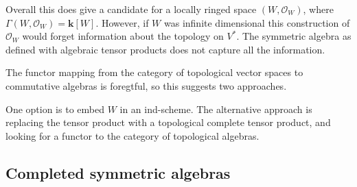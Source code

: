     
    Overall this does give a candidate for a locally ringed space 
    \( (W, \mathcal{O}_W)\), where \( \Gamma(W, \mathcal{O}_W ) = \mathbf{k}[W]\). However, if \(W\) was infinite dimensional this construction of \( \mathcal{O}_W\) would forget information about the topology on \(V^*\). The symmetric algebra as defined with algebraic tensor products does not capture all the information. 
    
    The functor mapping from the category of topological vector spaces to commutative algebras is foregtful, so this suggests two approaches.
    
    One option is to embed \(W\) in an ind-scheme.
    The alternative approach is replacing the tensor product with a topological complete tensor product, and looking for a functor to the category of topological algebras.
    
    \subsection{Completed symmetric algebras}
    